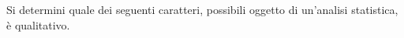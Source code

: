 Si determini quale dei seguenti caratteri, 
possibili oggetto di 
un'analisi statistica, è qualitativo.
